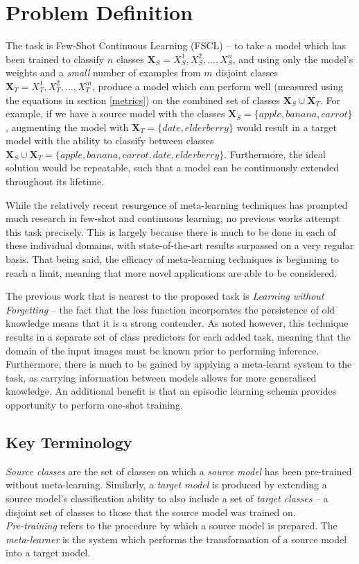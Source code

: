 \documentclass{report}
\begin{document}
\chapter{Problem Definition} \label{problem-definition}
The task is Few-Shot Continuous Learning (FSCL) -- to take a model which has been trained to classify $n$ classes $\bm{X}_S = {X_S^1, X_S^2, ..., X_S^n}$, and using only the model's weights and a \emph{small} number of examples from $m$ disjoint classes $\bm{X}_T = {X_T^1, X_T^2, ..., X_T^m}$, produce a model which can perform well (measured using the equations in section \ref{metrics}) on the combined set of classes $\bm{X}_S \cup \bm{X}_T$. For example, if we have a source model with the classes $\bm{X}_S = \lbrace apple, banana, carrot \rbrace$, augmenting the model with $\bm{X}_T = \lbrace date, elderberry \rbrace$ would result in a target model with the ability to classify between classes $\bm{X}_S \cup \bm{X}_T = \lbrace apple, banana, carrot, date, elderberry \rbrace$.
Furthermore, the ideal solution would be repeatable, such that a model can be continuously extended throughout its lifetime. \par
While the relatively recent resurgence of meta-learning techniques has prompted much research in few-shot and continuous learning, no previous works attempt this task precisely. This is largely because there is much to be done in each of these individual domains, with state-of-the-art results surpassed on a very regular basis. That being said, the efficacy of meta-learning techniques is beginning to reach a limit, meaning that more novel applications are able to be considered.	\par
The previous work that is nearest to the proposed task is \textit{Learning without Forgetting}\parencite{lwf} -- the fact that the loss function incorporates the persistence of old knowledge means that it is a strong contender. As noted however, this technique results in a separate set of class predictors for each added task, meaning that the domain of the input images must be known prior to performing inference. Furthermore, there is much to be gained by applying a meta-learnt system to the task, as carrying information between models allows for more generalised knowledge. An additional benefit is that an episodic learning schema provides opportunity to perform one-shot training. \par

\section{Key Terminology}
\textit{Source classes} are the set of classes on which a \textit{source model} has been pre-trained without meta-learning. Similarly, a \textit{target model} is produced by extending a source model's classification ability to also include a set of \textit{target classes} -- a disjoint set of classes to those that the source model was trained on. \\
\textit{Pre-training} refers to the procedure by which a source model is prepared. The \textit{meta-learner} is the system which performs the transformation of a source model into a target model.
\end{document}
